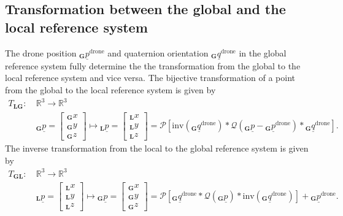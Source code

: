 \subsection*{Transformation between the global and the local reference system}
The drone position
$
{}_\textbf{G} \underline p^\text{drone}
$
and quaternion orientation
$
{}_\textbf{G} \underline q^\text{drone}
$
in the global reference system
fully determine the the transformation
from the global to the local reference system and vice versa.
The bijective transformation of a point 
from the global to the local reference system
is given by 
\begin{align} \label{equ:global_to_local_transformation}
    T_\textbf{LG}
    :\ 
    &\mathbb{R}^3 \rightarrow \mathbb{R}^3
    \nonumber \\
    &{}_\textbf{G} \underline p 
    =
    \begin{bmatrix}
        {}_\textbf{G} x \\ {}_\textbf{G} y \\ {}_\textbf{G} z
    \end{bmatrix}
    \mapsto
    {}_\textbf{L} \underline p 
    =
    \begin{bmatrix}
        {}_\textbf{L} x \\ {}_\textbf{L} y \\ {}_\textbf{L} z
    \end{bmatrix}
    =
    \mathcal{P}
    \left[
        \mathrm{inv}
        \left(
            {}_\textbf{G} \underline q^\text{drone}
        \right)
        *
        \mathcal{Q}
        \left(
            {}_\textbf{G} \underline p - {}_\textbf{G} \underline p^\text{drone}
        \right)
        *
        {}_\textbf{G} \underline q^\text{drone}
    \right].
\end{align}
The inverse transformation 
from the local to the global reference system
is given by 
\begin{align} \label{eq:local_to_global_transformation}
    T_\textbf{GL}
    :\ 
    &\mathbb{R}^3 \rightarrow \mathbb{R}^3
    \nonumber \\
    &{}_\textbf{L} \underline p 
    =
    \begin{bmatrix}
        {}_\textbf{L} x \\ {}_\textbf{L} y \\ {}_\textbf{L} z
    \end{bmatrix}
    \mapsto
    {}_\textbf{G} \underline p 
    =
    \begin{bmatrix}
        {}_\textbf{G} x \\ {}_\textbf{G} y \\ {}_\textbf{G} z
    \end{bmatrix}
    =
    \mathcal{P}
    \left[
        {}_\textbf{G} \underline q^\text{drone}
        *
        \mathcal{Q}
        \left(
            {}_\textbf{G} \underline p
        \right)
        *
        \mathrm{inv}
        \left(
            {}_\textbf{G} \underline q^\text{drone}
        \right)
    \right]
    + 
    {}_\textbf{G} \underline p^\text{drone}
    .
\end{align}
